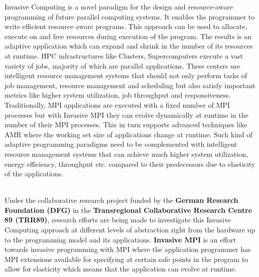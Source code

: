 Invasive Computing is a novel paradigm for the design and resource-aware programming of future parallel computing systems. It enables the programmer to write efficient resource aware programs. This approach can be used to allocate, execute on and free resources during execution of the program. The results is an adaptive application which can expand and shrink in the number of its resources at runtime. HPC infrastructures like Clusters, Supercomputers execute a vast variety of jobs, majority of which are parallel applications. These centers use intelligent resource management systems that should not only perform tasks of job management, resource management and scheduling but also satisfy important metrics like higher system utilization, job throughput and responsiveness. Traditionally, MPI applications are executed with a fixed number of MPI processes but with Invasive MPI they can evolve dynamically at runtime in the number of their MPI processes. This in turn supports advanced techniques like AMR where the working set size of applications change at runtime. Such kind of adaptive programming paradigms need to be complemented with intelligent resource management systems that can  achieve much higher system utilization, energy efficiency, throughput etc. compared to their predecessors due to elasticity of the applications.\par
\noindent
\\Under the collaborative research project funded by the \textbf{German Research Foundation (DFG)} in the \textbf{Transregional Collaborative Research Centre 89 (TRR89)}, research efforts are being made to investigate this Invasive Computing approach at different levels of abstraction right from the hardware up to the programming model and its applications. \textbf{Invasive MPI} is an effort towards invasive programming with MPI where the application programmer has MPI extensions available for specifying at certain safe points in the program to allow for elasticity which means that the application can evolve at runtime.\\ \par

